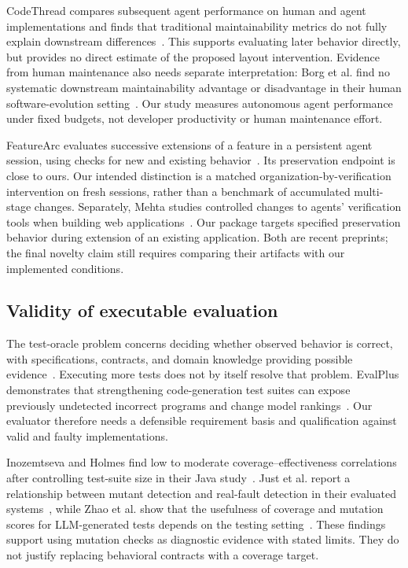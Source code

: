 \documentclass[11pt,a4paper]{article}
\begin{document}
CodeThread compares subsequent agent performance on human and agent implementations and finds that traditional maintainability metrics do not fully explain downstream differences~\cite{patel2026codethread}. This supports evaluating later behavior directly, but provides no direct estimate of the proposed layout intervention. Evidence from human maintenance also needs separate interpretation: Borg et al. find no systematic downstream maintainability advantage or disadvantage in their human software-evolution setting~\cite{borg2026echoes}. Our study measures autonomous agent performance under fixed budgets, not developer productivity or human maintenance effort.

FeatureArc evaluates successive extensions of a feature in a persistent agent session, using checks for new and existing behavior~\cite{wang2026featurearc}. Its preservation endpoint is close to ours. Our intended distinction is a matched organization-by-verification intervention on fresh sessions, rather than a benchmark of accumulated multi-stage changes. Separately, Mehta studies controlled changes to agents' verification tools when building web applications~\cite{mehta2026verification}. Our package targets specified preservation behavior during extension of an existing application. Both are recent preprints; the final novelty claim still requires comparing their artifacts with our implemented conditions.

\subsection{Validity of executable evaluation}
The test-oracle problem concerns deciding whether observed behavior is correct, with specifications, contracts, and domain knowledge providing possible evidence~\cite{barr2015oracle}. Executing more tests does not by itself resolve that problem. EvalPlus demonstrates that strengthening code-generation test suites can expose previously undetected incorrect programs and change model rankings~\cite{liu2023evalplus}. Our evaluator therefore needs a defensible requirement basis and qualification against valid and faulty implementations.

Inozemtseva and Holmes find low to moderate coverage--effectiveness correlations after controlling test-suite size in their Java study~\cite{inozemtseva2014coverage}. Just et al. report a relationship between mutant detection and real-fault detection in their evaluated systems~\cite{just2014mutants}, while Zhao et al. show that the usefulness of coverage and mutation scores for LLM-generated tests depends on the testing setting~\cite{zhao2026coverage}. These findings support using mutation checks as diagnostic evidence with stated limits. They do not justify replacing behavioral contracts with a coverage target.
\end{document}
